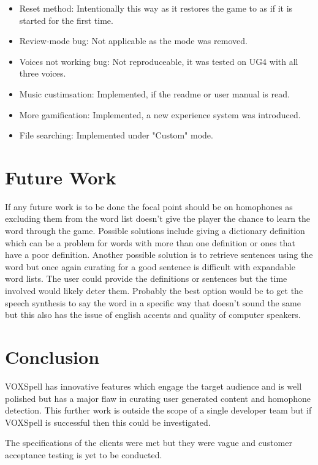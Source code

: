 \documentclass[conference]{IEEEtran}
\begin{document}
\begin{itemize}
			\item Reset method: Intentionally this way as it restores the game to as if it is started for the first time.
			\item Review-mode bug: Not applicable as the mode was removed.
			\item Voices not working bug: Not reproduceable, it was tested on UG4 with all three voices.
			\item Music custimsation: Implemented, if the readme or user manual is read.
			\item More gamification: Implemented, a new experience system was introduced.
			\item File searching: Implemented under "Custom" mode.
		\end{itemize}

\section{Future Work}
If any future work is to be done the focal point should be on homophones as excluding them from the word list doesn't give the player the chance to learn the word through the game. Possible solutions include giving a dictionary definition which can be a problem for words with more than one definition or ones that have a poor definition. Another possible solution is to retrieve sentences using the word but once again curating for a good sentence is difficult with expandable word lists. The user could provide the definitions or sentences but the time involved would likely deter them. Probably the best option would be to get the speech synthesis to say the word in a specific way that doesn't sound the same but this also has the issue of english accents and quality of computer speakers.

\section{Conclusion}
VOXSpell has innovative features which engage the target audience and is well polished but has a major flaw in curating user generated content and homophone detection. This further work is outside the scope of a single developer team but if VOXSpell is successful then this could be investigated.

The specifications of the clients were met but they were vague and customer acceptance testing is yet to be conducted.

\end{document}
